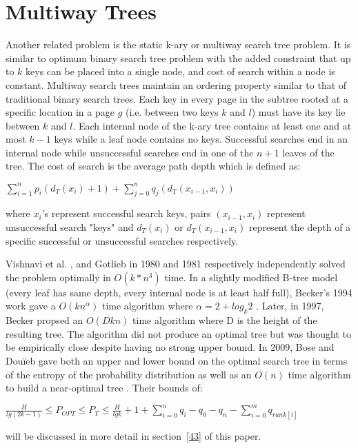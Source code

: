 \documentclass[letterpaper,12pt,titlepage,oneside,final]{book}
\theoremstyle{plain}
\begin{document}
\section{Multiway Trees} \label{sec:MWT}


Another related problem is the static k-ary or multiway search tree problem. It is similar to optimum binary search tree problem with the added constraint that up to $k$ keys can be placed into a single node, and cost of search within a node is constant. Multiway search trees maintain an ordering property similar to that of traditional binary search trees. Each key in every page in the subtree rooted at a specific location in a page $g$ (i.e. between two keys $k$ and $l$) must have its key lie between $k$ and $l$. Each internal node of the k-ary tree contains at least one and at most $k-1$ keys while a leaf node contains no keys. Successful searches end in an internal node while unsuccessful searches end in one of the $n+1$ leaves of the tree. The cost of search is the average path depth which is defined as:

\begin{center}
$\sum_{i=1}^{n} p_i(d_T(x_i)+1) + \sum_{j=0}^{n} q_j(d_T(x_{i-1},x_i))$
\end{center}

where $x_i$'s represent successful search keys, pairs $(x_{i-1},x_i)$ represent unsuccessful search "keys" and $d_T(x_i)$  or $d_T(x_{i-1},x_i)$ represent the depth of a specific successful or unsuccessful searches respectively.

Vishnavi et al. \cite{vaishnavi1980optimum}, and Gotlieb  \cite{gotlieb1981optimal} in 1980 and 1981 respectively independently solved the problem optimally in $O(k*n^3)$ time. In a slightly modified B-tree model (every leaf has same depth, every internal node is at least half full), Becker's 1994 work gave a $O(kn^{\alpha})$ time algorithm where $\alpha=2+log_k 2$ \cite{becker1994new}. Later, in 1997, Becker propsed an $O(Dkn)$ time algorithm where D is the height of the resulting tree\cite{becker1997construction}. The algorithm did not produce an optimal tree but was thought to be empirically close despite having no strong upper bound. In 2009, Bose and Dou\"{i}eb gave both an upper and lower bound on the optimal search tree in terms of the entropy of the probability distribution as well as an $O(n)$ time algorithm to build a near-optimal tree \cite{bose2009efficient}. Their bounds of:
\begin{center}
$\frac{H}{lg(2k-1)} \leq P_{OPT} \leq P_T \leq \frac{H}{lg k} + 1 + \sum_{i=0}^n q_i - q_0 - q_n - \sum_{i=0}^m q_{rank[i]}$
\end{center}
will be discussed in more detail in section~\ref{43} of this paper.
\end{document}
